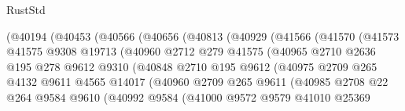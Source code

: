 \begin{lexlean}{RustStd}
\begin{coremodule}
                      (@40194
                        (@40453
                          (@40566
                            (@40656
                              (@40813
                                (@40929
                                  (@41566
                                    (@41570
                                      (@41573
                                        @41575
                                        @9308
                                        @19713
                                        (@40960
                                          @2712
                                          @279
                                          @41575
                                          (@40965
                                            @2710
                                            @2636
                                            @195
                                            @278
                                            @9612
                                            @9310
                                            (@40848
                                              @2710
                                              @195
                                              @9612
                                              (@40975
                                                @2709
                                                @265
                                                @4132
                                                @9611
                                                @4565
                                                @14017
                                                (@40960
                                                  @2709
                                                  @265
                                                  @9611
                                                  (@40985
                                                    @2708
                                                    @22
                                                    @264
                                                    @9584
                                                    @9610
                                                    (@40992
                                                      @9584
                                                      (@41000
                                                        @9572
                                                        @9579
                                                        @41010
                                                        @25369

\end{coremodule}
\end{lexlean}
